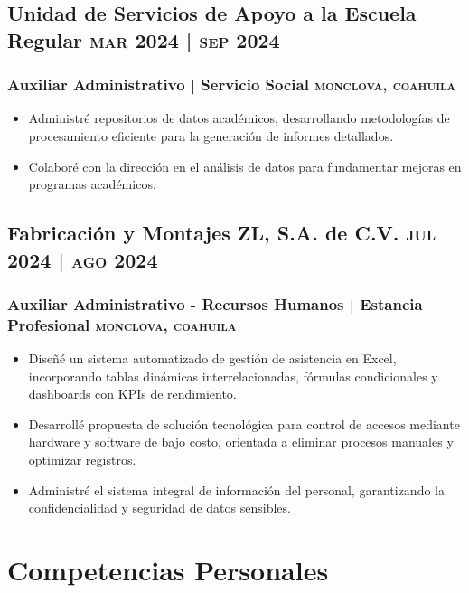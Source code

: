 \documentclass{article}
\newcommand{\rside}[1]{\hfill \normalfont\scshape\MakeLowercase{#1}}
\begin{document}
\subsection{Unidad de Servicios de Apoyo a la Escuela Regular \rside{Mar 2024 | Sep 2024}}
\subsubsection{Auxiliar Administrativo | Servicio Social \rside{Monclova, Coahuila}}
\begin{itemize}
  \item Administré repositorios de datos académicos, desarrollando metodologías de procesamiento eficiente para la generación de informes detallados.
  \item Colaboré con la dirección en el análisis de datos para fundamentar mejoras en programas académicos.
\end{itemize}

\subsection{Fabricación y Montajes ZL, S.A. de C.V. \rside{Jul 2024 | Ago 2024}}
\subsubsection{Auxiliar Administrativo - Recursos Humanos | Estancia Profesional \rside{Monclova, Coahuila}}
\begin{itemize}
  \item Diseñé un sistema automatizado de gestión de asistencia en Excel, incorporando tablas dinámicas interrelacionadas, fórmulas condicionales y dashboards con KPIs de rendimiento.
  \item Desarrollé propuesta de solución tecnológica para control de accesos mediante hardware y software de bajo costo, orientada a eliminar procesos manuales y optimizar registros.
  \item Administré el sistema integral de información del personal, garantizando la confidencialidad y seguridad de datos sensibles.
\end{itemize}

\section{\faUserFriends\enspace Competencias Personales}
\end{document}
